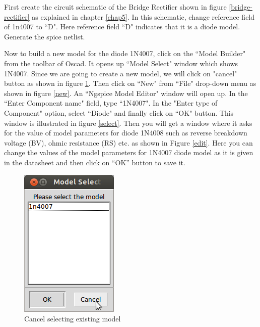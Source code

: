 First create the circuit schematic of the Bridge Rectifier shown in figure \ref{bridge-rectifier} as explained in chapter \ref{chap5}. In this schematic, change reference field of 1n4007 to ``D". Here reference field ``D" indicates that it is a diode model. Generate the spice netlist.

Now to build a new model for the diode 1N4007, click on the ``Model Builder" from the toolbar of Oscad. It opens up ``Model Select" window which shows 1N4007. Since we are going to create a new model, we will click on "cancel" button as shown in figure \ref{cancel}. Then click on ``New" from ``File" drop-down menu as shown in figure \ref{new}. An ``Ngspice Model Editor" window will open up. In the ``Enter Component name" field, type ``1N4007". In the "Enter type of Component" option, select ``Diode" and finally click on ``OK" button. This window is illustrated in figure \ref{select}. Then you will get a window where it asks for the value of model parameters for diode 1N4008 such as reverse breakdown voltage (BV), ohmic resistance (RS) etc. as shown in Figure \ref{edit}. Here you can change the values of the model parameters for 1N4007 diode model as it is given in the datasheet and then click on “OK” button to save it.


\begin{figure}[t]%
\begin{center}
\includegraphics[width=0.3\linewidth]{figures/cancel-model-b.png}%
\caption{Cancel selecting existing model}
\label{cancel}
\end{center}
\end{figure} 

